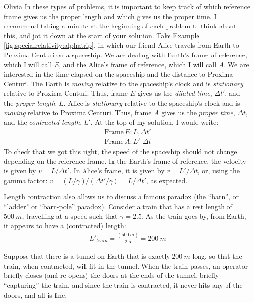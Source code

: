 \newpage
\begin{studentOpinion}{Olivia}
In these types of problems, it is important to keep track of which reference frame gives us the proper length and which gives us the proper time. I recommend taking a minute at the beginning of each problem to think about this, and jot it down at the start of your solution. Take Example \ref{fig:specialrelativity:alphatrip}, in which our friend Alice travels from Earth to Proxima Centuri on a spaceship. We are dealing with Earth's frame of reference, which I will call $E$, and the Alice's frame of reference, which I will call $A$. We are interested in the time elapsed on the spaceship and the distance to Proxima Centuri. The Earth is \textit{moving} relative to the spaceship's clock and is \textit{stationary} relative to Proxima Centuri. Thus, frame $E$ gives us the \textit{dilated time}, $\Delta t'$, and the \textit{proper length}, $L$. Alice is \textit{stationary} relative to the spaceship's clock and is \textit{moving} relative to Proxima Centuri. Thus, frame $A$ gives us the \textit{proper time}, $\Delta t$, and the \textit{contracted length}, $L'$.   
At the top of my solution, I would write:
\begin{align*}
\textrm{Frame}\, E: L, \Delta t'\\
\textrm{Frame}\, A: L', \Delta t
\end{align*}
To check that we got this right, the speed of the spaceship should not change depending on the reference frame. In the Earth's frame of reference, the velocity is given by $v=L/\Delta t'$. In Alice's frame, it is given by $v=L'/\Delta t$, or, using the gamma factor:  $v=(L/\gamma)/(\Delta t'/\gamma)=L/\Delta t'$, as expected.
\end{studentOpinion}

Length contraction also allows us to discuss a famous paradox (the ``barn'', or ``ladder'' or ``barn-pole'' paradox). Consider a train that has a rest length of $\SI{500}{m}$, travelling at a speed such that $\gamma = 2.5$. As the train goes by, from Earth, it appears to have a (contracted) length:
\begin{align*}
L'_{train}=\frac{(\SI{500}{m})}{2.5}=\SI{200}{m}
\end{align*}

Suppose that there is a tunnel on Earth that is exactly $\SI{200}{m}$ long, so that the train, when contracted, will fit in the tunnel. When the train passes, an operator briefly closes (and re-opens) the doors at the ends of the tunnel, briefly ``capturing'' the train, and since the train is contracted, it never hits any of the doors, and all is fine.

